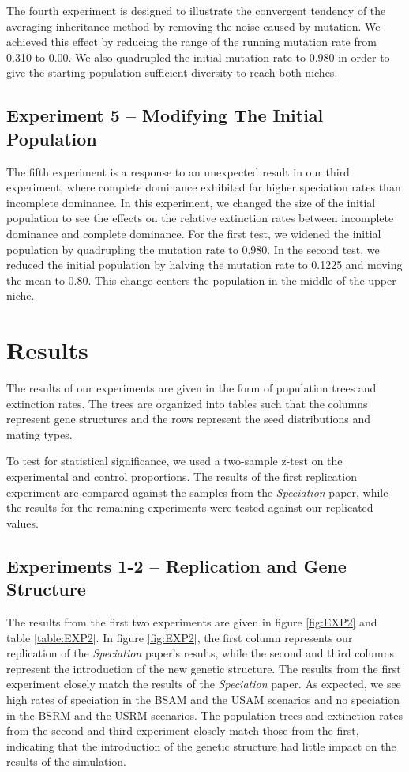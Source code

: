 \documentclass{article}
\begin{document}
The fourth experiment is designed to illustrate the convergent tendency of the averaging inheritance method by removing the noise caused by mutation. We achieved this effect by reducing the range of the running mutation rate from 0.310 to 0.00. We also quadrupled the initial mutation rate to 0.980 in order to give the starting population sufficient diversity to reach both niches. 

\subsection{Experiment 5 -- Modifying The Initial Population}

The fifth experiment is a response to an unexpected result in our third experiment, where complete dominance exhibited far higher speciation rates than incomplete dominance. In this experiment, we changed the size of the initial population to see the effects on the relative extinction rates between incomplete dominance and complete dominance. For the first test, we widened the initial population by quadrupling the mutation rate to 0.980. In the second test, we reduced the initial population by halving the mutation rate to 0.1225 and moving the mean to 0.80. This change centers the population in the middle of the upper niche.



\section{Results}

The results of our experiments are given in the form of population trees and extinction rates. The trees are organized into tables such that the columns represent gene structures and the rows represent the seed distributions and mating types.

To test for statistical significance, we used a two-sample z-test on the experimental and control proportions. The results of the first replication experiment are compared against the samples from the \textit{Speciation} paper, while the results for the remaining experiments were tested against our replicated values. 

\subsection{Experiments 1-2 -- Replication and Gene Structure}

The results from the first two experiments are given in figure \ref{fig:EXP2} and table \ref{table:EXP2}. In figure \ref{fig:EXP2}, the first column represents our replication of the \textit{Speciation} paper's results, while the second and third columns represent the introduction of the new genetic structure. The results from the first experiment closely match the results of the \textit{Speciation} paper. As expected, we see high rates of speciation in the BSAM and the USAM scenarios and no speciation in the BSRM and the USRM scenarios. The population trees and extinction rates from the second and third experiment closely match those from the first, indicating that the introduction of the genetic structure had little impact on the results of the simulation.
\end{document}
